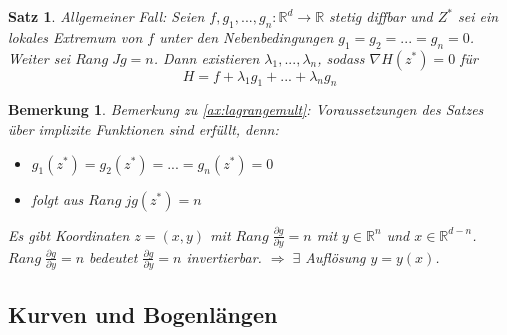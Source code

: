 \documentclass[12pt,a4paper]{article}%
\newtheorem{satz}{Satz}[section]
\newtheorem{bem}{Bemerkung}[section]
\numberwithin{equation}{section}
\newcommand{\R}{\mathbb{R}} %
\newcommand{\diffp}{\partial}
\numberwithin{equation}{subsection}
\begin{document}
  \begin{satz}
    Allgemeiner Fall: Seien $f,g_1,...,g_n : \R^d \rightarrow \R$ stetig diffbar und $Z^*$ sei ein lokales Extremum von $f$ unter den Nebenbedingungen $g_1 = g_2 = ... = g_n = 0$. Weiter sei $Rang\;Jg = n$. Dann existieren $\lambda_1,...,\lambda_n$, sodass $\nabla H(z^*) = 0$ für 
    \begin{equation}
      H = f + \lambda_1g_1 + ... + \lambda_n g_n
    \end{equation}\label{ax:lagrangemult}
  \end{satz}
  \begin{bem}
    Bemerkung zu \eqref{ax:lagrangemult}: Voraussetzungen des Satzes über implizite Funktionen sind erfüllt, denn:
    \begin{itemize}
      \item[V1) ] $g_1(z^*) = g_2(z^*) = ... = g_n(z^*) = 0$
      \item[V2) ] folgt aus $Rang\; jg(z^*) = n$
    \end{itemize}
    Es gibt Koordinaten $z = (x,y)$ mit $Rang \; \frac{\diffp g}{\diffp y} = n$ mit $y \in \R^n$ und $x \in \R^{d-n}$. $Rang \; \frac{\diffp g}{\diffp y} = n$ bedeutet $\frac{\diffp g}{\diffp y} = n$ invertierbar. \newline
    $\Rightarrow \; \exists$ Auflösung $y = y(x)$.
  \end{bem}
  
  \subsection{Kurven und Bogenlängen}
\end{document}
